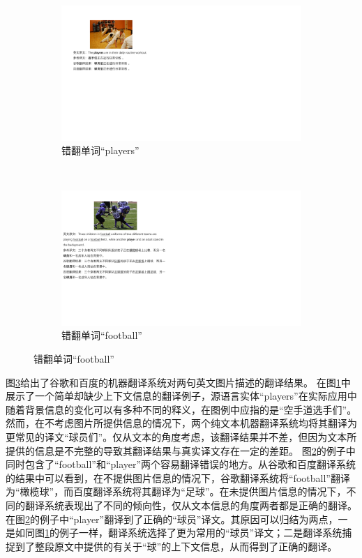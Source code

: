 \begin{figure}[!htbp]
    \centering
    \begin{subfigure}[b]{1\linewidth}
      \centering
      \includegraphics{Img/fig_1_case_players.pdf}
      \caption{错翻单词“players”}
      \label{fig:1_players}
    \end{subfigure}%
    \\
    \begin{subfigure}[b]{\linewidth}
      \centering
      \includegraphics{Img/fig_1_case_football.pdf}
      \caption{错翻单词“football”}
      \label{fig:1_football}
    \end{subfigure}
    \label{fig:1_translation_cases}
\end{figure}
图\ref{fig:1_translation_cases}给出了谷歌和百度的机器翻译系统对两句英文图片描述的翻译结果。
在图\ref{fig:1_players}中展示了一个简单却缺少上下文信息的翻译例子，源语言实体“players”在实际应用中随着背景信息的变化可以有多种不同的释义，在图例中应指的是“空手道选手们”。然而，在不考虑图片所提供信息的情况下，两个纯文本机器翻译系统均将其翻译为更常见的译文“球员们”。仅从文本的角度考虑，该翻译结果并不差，但因为文本所提供的信息是不完整的导致其翻译结果与真实译文存在一定的差距。
图\ref{fig:1_football}的例子中同时包含了“football”和“player”两个容易翻译错误的地方。从谷歌和百度翻译系统的结果中可以看到，在不提供图片信息的情况下，谷歌翻译系统将“football”翻译为“橄榄球”，而百度翻译系统将其翻译为“足球”。在未提供图片信息的情况下，不同的翻译系统表现出了不同的倾向性，仅从文本信息的角度两者都是正确的翻译。在图\ref{fig:1_football}的例子中“player”翻译到了正确的“球员”译文。其原因可以归结为两点，一是如同图\ref{fig:1_players}的例子一样，翻译系统选择了更为常用的“球员”译文；二是翻译系统捕捉到了整段原文中提供的有关于“球”的上下文信息，从而得到了正确的翻译。


